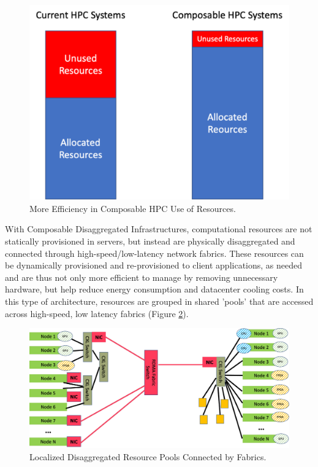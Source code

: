 \begin{figure}
\centerline{\includegraphics[width=.8\columnwidth]{use.pdf}}
\caption{More Efficiency in Composable HPC Use of Resources.} 
\label{fig:stranded}
\end{figure}

With Composable Disaggregated Infrastructures, computational resources are not statically provisioned in servers, but instead are physically disaggregated and connected through high-speed/low-latency network fabrics.  These resources can be dynamically provisioned and re-provisioned to client applications, as needed and are thus not only more efficient to manage by removing unnecessary hardware, but help reduce energy consumption and datacenter cooling costs. In this type of architecture, resources are grouped in shared 'pools' that are accessed across high-speed, low latency fabrics (Figure \ref{fig:Pools}). 


\begin{figure}
\centerline{\includegraphics[width=\columnwidth]{pools.pdf}}
\caption{Localized Disaggregated Resource Pools Connected by Fabrics.} 
\label{fig:Pools}
\end{figure}
  
